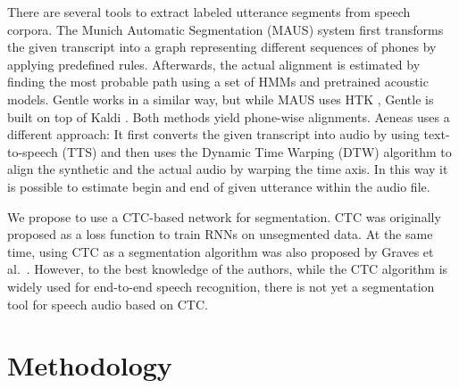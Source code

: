 \documentclass[runningheads]{llncs}
\begin{document}
There are several tools to extract labeled utterance segments from speech corpora.
The Munich Automatic Segmentation (MAUS) system \cite{schiel1999} first transforms the given transcript into a graph representing different sequences of phones by applying predefined rules. 
Afterwards, the actual alignment is estimated by finding the most probable path using a set of HMMs and pretrained acoustic models.
Gentle works in a similar way, but while MAUS uses HTK \cite{young1993htk}, Gentle is built on top of Kaldi \cite{Povey2011}.
Both methods yield phone-wise alignments.
Aeneas \cite{aeneas2017} uses a different approach:
It first converts the given transcript into audio by using text-to-speech (TTS) and then uses the Dynamic Time Warping (DTW) algorithm to align the synthetic and the actual audio by warping the time axis. 
In this way it is possible to estimate begin and end of given utterance within the audio file.

We propose to use a CTC-based network for segmentation.
CTC was originally proposed as a loss function to train RNNs on unsegmented data.
At the same time, using CTC as a segmentation algorithm was also proposed by Graves et al.~\cite{Graves2006}.
However, to the best knowledge of the authors, while the CTC algorithm is widely used for end-to-end speech recognition,
there is not yet a segmentation tool for speech audio based on CTC.




\section{Methodology}
\end{document}
